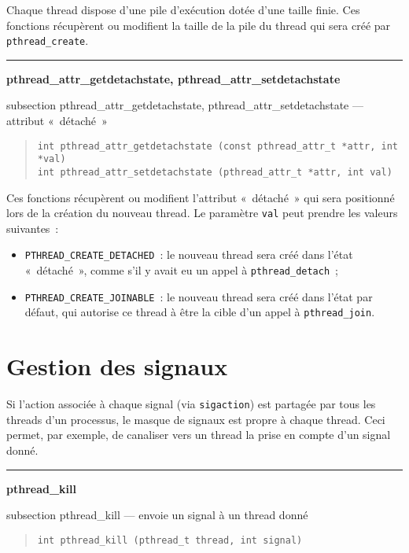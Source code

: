 \documentclass [twoside] {report}
\newcommand {\primitive} [1]
    {
	\phantomsection
	{\large \bf #1}
	\addcontentsline {toc} {subsection} {#1}
    }
\newcommand {\separation}
    {
	\vspace {5mm}
	\nopagebreak
	\hrule
    }
\begin{document}
Chaque thread dispose d'une pile d'exécution dotée d'une taille
finie. Ces fonctions récupèrent ou modifient la taille de la pile
du thread qui sera créé par \verb|pthread_create|.


\separation
\primitive {pthread\_attr\_getdetachstate,
pthread\_attr\_setdetachstate} --- attribut «~détaché~»

\begin {quote}
\begin {verbatim}
int pthread_attr_getdetachstate (const pthread_attr_t *attr, int *val)
int pthread_attr_setdetachstate (pthread_attr_t *attr, int val)
\end{verbatim}
\end {quote}

Ces fonctions récupèrent ou modifient l'attribut «~détaché~» qui
sera positionné lors de la création du nouveau thread. Le paramètre
\texttt {val} peut prendre les valeurs suivantes~:

\begin {itemize}
    \item \verb|PTHREAD_CREATE_DETACHED|~: le nouveau thread sera
	créé dans l'état «~détaché~», comme s'il y avait eu un appel
	à \verb|pthread_detach|~;
    \item \verb|PTHREAD_CREATE_JOINABLE|~: le nouveau thread sera
	créé dans l'état par défaut, qui autorise ce thread à être
	la cible d'un appel à \verb|pthread_join|.
\end {itemize}


\section {Gestion des signaux}

Si l'action associée à chaque signal (via \texttt {sigaction}) est
partagée par tous les threads d'un processus, le masque de signaux est
propre à chaque thread. Ceci permet, par exemple, de canaliser vers un
thread la prise en compte d'un signal donné.


\separation 
\primitive {pthread\_kill} --- envoie un signal à un thread donné

\begin {quote}
\begin {verbatim}
int pthread_kill (pthread_t thread, int signal)
\end{verbatim}
\end {quote}
\end{document}
